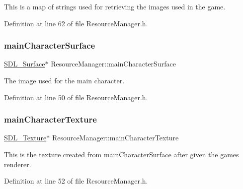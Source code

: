 This is a map of strings used for retrieving the images used in the game. 



Definition at line 62 of file Resource\+Manager.\+h.

\mbox{\label{class_resource_manager_a7dea3b6c85cc513e432c37b3be589ba2}} 
\subsubsection{\texorpdfstring{mainCharacterSurface}{mainCharacterSurface}}
{\footnotesize\ttfamily \mbox{\hyperlink{struct_s_d_l___surface}{S\+D\+L\+\_\+\+Surface}}$\ast$ Resource\+Manager\+::main\+Character\+Surface}



The image used for the main character. 



Definition at line 50 of file Resource\+Manager.\+h.

\mbox{\label{class_resource_manager_a671fa64fc93e8fad27e25fdcfddbc982}} 
\subsubsection{\texorpdfstring{mainCharacterTexture}{mainCharacterTexture}}
{\footnotesize\ttfamily \mbox{\hyperlink{_s_d_l__render_8h_a17850d7f1f5de457727cb3cf66b3a7f5}{S\+D\+L\+\_\+\+Texture}}$\ast$ Resource\+Manager\+::main\+Character\+Texture}



This is the texture created from main\+Character\+Surface after given the game\textquotesingle{}s renderer. 



Definition at line 52 of file Resource\+Manager.\+h.

\mbox{\label{class_resource_manager_aa581160d976db2ad4cd19527a2111923}} 
